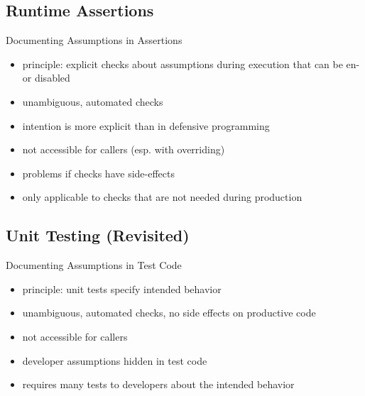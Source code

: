 \subsection{Runtime Assertions}
\begin{frame}{\insertsubsection}
	\begin{fancycolumns}
		\begin{exampletight}{Documenting Assumptions in Assertions}
			\centering\makebox{\usebox{\runtimeassertions}}
		\end{exampletight}
		\nextcolumn
		\begin{definition}{\insertsubsection}
			\begin{itemize}
				\item principle: explicit checks about assumptions during execution that can be en- or disabled
				\item[+] unambiguous, automated checks
				\item[+] intention is more explicit than in defensive programming 
				\item[--] not accessible for callers (esp. with overriding)
				\item[--] problems if checks have side-effects
				\item[--] only applicable to checks that are not needed during production
			\end{itemize}
		\end{definition}
	\end{fancycolumns}
\end{frame}

\subsection{Unit Testing (Revisited)}
\begin{frame}{\insertsubsection}
	\begin{fancycolumns}
		\begin{exampletight}{Documenting Assumptions in Test Code}
			\centering\makebox{\usebox{\unittests}}
		\end{exampletight}
		\nextcolumn
		\begin{definition}{\insertsubsection}
			\begin{itemize}
				\item principle: unit tests specify intended behavior
				\item[+] unambiguous, automated checks, no side effects on productive code
				\item[--] not accessible for callers
				\item[--] developer assumptions hidden in test code
				\item[--] requires many tests to  developers about the intended behavior
			\end{itemize}
		\end{definition}
	\end{fancycolumns}
\end{frame}


